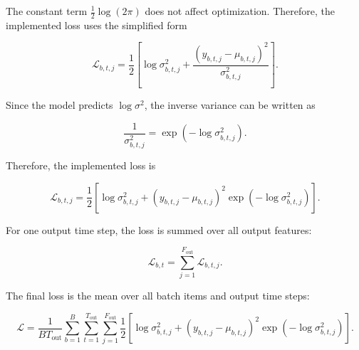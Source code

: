 \documentclass{book}
\begin{document}
        The constant term \(\frac{1}{2}\log(2\ensuremath{\pi})\) does not affect optimization. Therefore, the implemented loss uses the simplified form
        
        \[
            \mathcal{L}_{b,t,j}
            =
            \frac{1}{2}
            \left[
                \log \ensuremath{\sigma}^2_{b,t,j}
                +
                \frac{
                    \left(
                        y_{b,t,j}
                        -
                        \ensuremath{\mu}_{b,t,j}
                    \right)^2
                }{
                    \ensuremath{\sigma}^2_{b,t,j}
                }
            \right].
        \]
        
        Since the model predicts \(\log \ensuremath{\sigma}^2\), the inverse variance can be written as
        
        \[
            \frac{1}{\ensuremath{\sigma}^2_{b,t,j}}
            =
            \exp
            \left(
                -
                \log \ensuremath{\sigma}^2_{b,t,j}
            \right).
        \]
        
        Therefore, the implemented loss is
        
        \[
            \mathcal{L}_{b,t,j}
            =
            \frac{1}{2}
            \left[
                \log \ensuremath{\sigma}^2_{b,t,j}
                +
                \left(
                    y_{b,t,j}
                    -
                    \ensuremath{\mu}_{b,t,j}
                \right)^2
                \exp
                \left(
                    -
                    \log \ensuremath{\sigma}^2_{b,t,j}
                \right)
            \right].
        \]
        
        For one output time step, the loss is summed over all output features:
        
        \[
            \mathcal{L}_{b,t}
            =
            \sum_{j=1}^{F_{\mathrm{out}}}
            \mathcal{L}_{b,t,j}.
        \]
        
        The final loss is the mean over all batch items and output time steps:
        
        \[
            \mathcal{L}
            =
            \frac{1}{BT_{\mathrm{out}}}
            \sum_{b=1}^{B}
            \sum_{t=1}^{T_{\mathrm{out}}}
            \sum_{j=1}^{F_{\mathrm{out}}}
            \frac{1}{2}
            \left[
                \log \ensuremath{\sigma}^2_{b,t,j}
                +
                \left(
                    y_{b,t,j}
                    -
                    \ensuremath{\mu}_{b,t,j}
                \right)^2
                \exp
                \left(
                    -
                    \log \ensuremath{\sigma}^2_{b,t,j}
                \right)
            \right].
        \]
    
\end{document}
